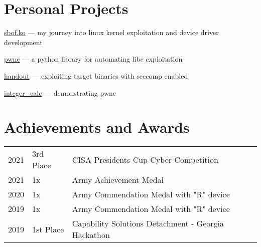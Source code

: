 \documentclass[]{resume}
\begin{document}
\begin{minipage}[t]{0.69\textwidth}
\section{Personal Projects}
\begin{tightemize}
\item \href{https://joe-hilbert.gitbook.io/public-portfolio/content/sbof.ko}{sbof.ko} --- my journey into linux kernel exploitation and device driver development
\item \href{https://github.com/jhilbs3/pwnc}{pwnc} --- a python library for automating libc exploitation
\item \href{https://github.com/jhilbs3/portfolio/tree/main/chals/handout}{handout} --- exploiting target binaries with seccomp enabled
\item \href{https://github.com/jhilbs3/portfolio/tree/main/chals/integer_calc}{integer\_calc} --- demonstrating pwnc

\end{tightemize}

\section{Achievements and Awards}
\begin{tabular}{rll}
2021         & 3rd Place  & CISA Presidents Cup Cyber Competition \\
2021         & 1x         & Army Achievement Medal \\
2020		 & 1x         & Army Commendation Medal with "R" device \\
2019         & 1x         & Army Commendation Medal with "R" device \\
2019         & 1st Place  & Capability Solutions Detachment - Georgia Hackathon
\end{tabular}


\end{minipage}

%
%

\end{document}
